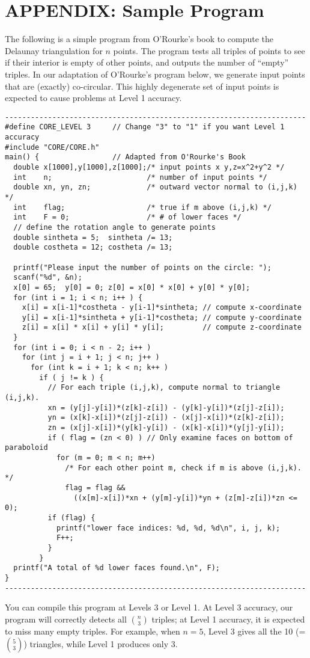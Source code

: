\newpage
\section{APPENDIX: Sample Program}
\label{sec-example-dt}
\label{example}
 
The following is a simple program from O'Rourke's book to 
compute the Delaunay triangulation for $n$ points.
The program tests all triples of points to see
if their interior is empty of other points, and outputs
the number of ``empty'' triples. 
In our adaptation of O'Rourke's program below,
we generate input points that are (exactly) co-circular.
This highly degenerate set of input points is expected
to cause problems at Level 1 accuracy.


{\scriptsize
\begin{verbatim}
----------------------------------------------------------------------
#define CORE_LEVEL 3     // Change "3" to "1" if you want Level 1 accuracy
#include "CORE/CORE.h"
main() {                 // Adapted from O'Rourke's Book
  double x[1000],y[1000],z[1000];/* input points x y,z=x^2+y^2 */
  int    n;                      /* number of input points */
  double xn, yn, zn;             /* outward vector normal to (i,j,k) */
  int    flag;                   /* true if m above (i,j,k) */
  int    F = 0;                  /* # of lower faces */
  // define the rotation angle to generate points
  double sintheta = 5;  sintheta /= 13;
  double costheta = 12; costheta /= 13;

  printf("Please input the number of points on the circle: ");
  scanf("%d", &n);
  x[0] = 65;  y[0] = 0; z[0] = x[0] * x[0] + y[0] * y[0];
  for (int i = 1; i < n; i++ ) {
    x[i] = x[i-1]*costheta - y[i-1]*sintheta; // compute x-coordinate
    y[i] = x[i-1]*sintheta + y[i-1]*costheta; // compute y-coordinate
    z[i] = x[i] * x[i] + y[i] * y[i];         // compute z-coordinate
  }
  for (int i = 0; i < n - 2; i++ )
    for (int j = i + 1; j < n; j++ )
      for (int k = i + 1; k < n; k++ ) 
        if ( j != k ) {
          // For each triple (i,j,k), compute normal to triangle (i,j,k). 
          xn = (y[j]-y[i])*(z[k]-z[i]) - (y[k]-y[i])*(z[j]-z[i]);
          yn = (x[k]-x[i])*(z[j]-z[i]) - (x[j]-x[i])*(z[k]-z[i]);
          zn = (x[j]-x[i])*(y[k]-y[i]) - (x[k]-x[i])*(y[j]-y[i]);
          if ( flag = (zn < 0) ) // Only examine faces on bottom of paraboloid
            for (m = 0; m < n; m++)
              /* For each other point m, check if m is above (i,j,k). */
              flag = flag && 
                ((x[m]-x[i])*xn + (y[m]-y[i])*yn + (z[m]-z[i])*zn <= 0);
          if (flag) {
            printf("lower face indices: %d, %d, %d\n", i, j, k);
            F++;
          }
        }
  printf("A total of %d lower faces found.\n", F);
}
----------------------------------------------------------------------
\end{verbatim}
}%

You can compile this program at Levels 3 or Level 1.
At Level 3 accuracy, our program will correctly
detects all ${n \choose 3}$ triples;
at Level 1 accuracy, it is expected to miss many empty triples.
For example, when $n=5$, Level 3 gives all the 10 (= ${5 \choose 3}$) 
triangles, while Level 1 produces only 3.

